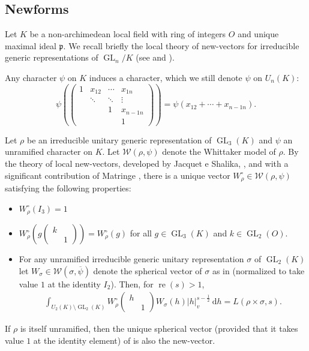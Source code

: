 \documentclass[a4paper,11pt]{amsart}
\theoremstyle{definition}
\newcommand{\gelle}{\operatorname{GL}}
\newcommand{\real}{\operatorname{re}}
\begin{document}
\subsection{Newforms}\label{subsect:newforms} Let $K$ be a non-archimedean local field with ring of integers $O$ and unique maximal ideal $\mathfrak{p}$.
We recall briefly the local theory of new-vectors for irreducible generic representations of  $\gelle_n/K$ (see \cite{conducteurgln} and \cite{matringe2012essential}).

Any character $\psi$ on $K$ induces a character, which we still denote $\psi$ on $U_n(K)$: 
\begin{equation}\label{eq:psiextended} \psi\left(\begin{pmatrix}
    1&x_{12}&\cdots&x_{1n}\\&\ddots&\ddots&\vdots\\&&1&x_{n-1n}\\&&&1
\end{pmatrix}\right) = \psi(x_{12}+\cdots + x_{n-1n}).\end{equation}

Let $\rho$ be an irreducible unitary generic representation of $\gelle_3(K)$ and $\psi$ an unramified character on $K$. Let $\mathcal{W}(\rho,\psi)$ denote the Whittaker model of $\rho$. By the theory of local new-vectors, developed by Jacquet e Shalika, \cite{conducteurgln}, and with a significant contribution of Matringe \cite{matringe2012essential}, there is a unique vector $W_\rho^\circ \in \mathcal{W}(\rho,\psi)$ satisfying the following properties:

\begin{itemize}
\item\label{itm:new-vector-normalization} $W_\rho^{\circ}(I_3) = 1$
\item $W_\rho^{\circ}\left(g\begin{pmatrix}k&\\&1\end{pmatrix}\right) = W_\rho^{\circ}(g)$  for all $g\in \gelle_3(K)$ and $k\in \gelle_2(O)$.
    \item For any unramified irreducible generic unitary representation $\sigma$ of $\gelle_2(K)$ let $W_{\sigma} \in \mathcal{W}(\sigma,\overline \psi)$ denote the spherical vector of $\sigma$ as in \cite{shintani} (normalized to take value $1$ at the identity $I_2$). Then, for $\real(s)>1$,  \begin{align*}\int_{U_{2}(K)\setminus\gelle_2(K)}W_\rho^{\circ}\begin{pmatrix}
        h&\\&1
    \end{pmatrix}W_{\sigma}(h)\vert{h}\vert_v^{s-\frac{1}{2}} \ \mathrm{d}h = L(\rho\times \sigma,s).\label{eq:newform1}\end{align*}
     \end{itemize}
If $\rho$ is itself unramified, then the unique spherical vector (provided that it takes value $1$ at the identity element) of \cite{shintani} is also the new-vector. 
\end{document}
